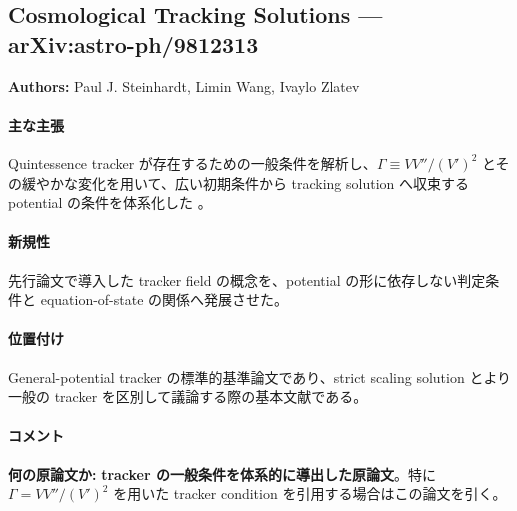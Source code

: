 \subsection{Cosmological Tracking Solutions --- arXiv:astro-ph/9812313}

\textbf{Authors:} Paul J. Steinhardt, Limin Wang, Ivaylo Zlatev

\paragraph{主な主張}
Quintessence tracker が存在するための一般条件を解析し、$\Gamma\equiv VV''/(V')^2$ とその緩やかな変化を用いて、広い初期条件から tracking solution へ収束する potential の条件を体系化した \cite{Steinhardt:1998tracking}。

\paragraph{新規性}
先行論文で導入した tracker field の概念を、potential の形に依存しない判定条件と equation-of-state の関係へ発展させた。

\paragraph{位置付け}
General-potential tracker の標準的基準論文であり、strict scaling solution とより一般の tracker を区別して議論する際の基本文献である。

\paragraph{コメント}
\textbf{何の原論文か:} \textbf{tracker の一般条件を体系的に導出した原論文}。特に $\Gamma=VV''/(V')^2$ を用いた tracker condition を引用する場合はこの論文を引く。
